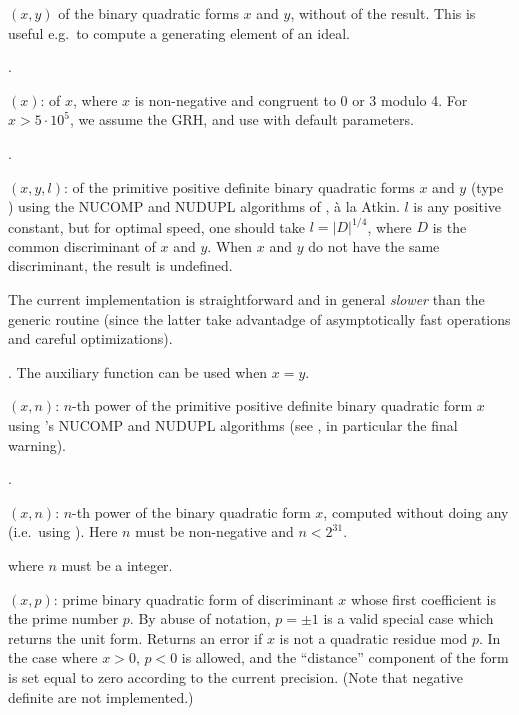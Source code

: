 $(x,y)$  of the binary quadratic forms
$x$ and $y$, without  of the result. This is useful e.g.~to
compute a generating element of an ideal.

.

$(x)$:  of $x$, where
$x$ is non-negative and congruent to 0 or 3 modulo 4. For $x > 5\cdot
10^5$, we assume the GRH, and use  with default
parameters.

.

$(x,y,l)$:  of the primitive positive
definite binary quadratic forms $x$ and $y$ (type ) using the NUCOMP
and NUDUPL algorithms of , \`a la Atkin. $l$ is any positive
constant, but for optimal speed, one should take $l=|D|^{1/4}$, where $D$ is
the common discriminant of $x$ and $y$. When $x$ and $y$ do not have the same
discriminant, the result is undefined.

The current implementation is straightforward and in general \emph{slower}
than the generic routine (since the latter take advantadge of asymptotically
fast operations and careful optimizations).

. The auxiliary function  can be
used when $x=y$.

$(x,n)$: $n$-th power of the primitive positive definite
binary quadratic form $x$ using 's NUCOMP and NUDUPL algorithms
(see , in particular the final warning).

.

$(x,n)$: $n$-th power of the binary quadratic form
$x$, computed without doing any  (i.e.~using ).
Here $n$ must be non-negative and $n<2^{31}$.

 where $n$ must be a 
integer.

$(x,p)$: prime binary quadratic form of discriminant
$x$ whose first coefficient is the prime number $p$. By abuse of notation,
$p = \pm 1$ is a valid special case which returns the unit form. Returns an
error if $x$ is not a quadratic residue mod $p$. In the case where $x>0$,
$p < 0$ is allowed, and the ``distance'' component of the form is set equal
to zero according to the current precision. (Note that negative definite
 are not implemented.)

